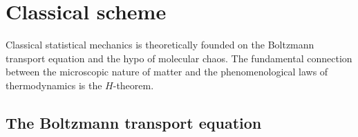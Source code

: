 

\section{Classical scheme}\label{sec:classical}

Classical statistical mechanics is theoretically founded on the Boltzmann transport
equation and the hypo of molecular chaos. The fundamental connection
between the microscopic nature of matter and the phenomenological laws of thermodynamics
is the $H$-theorem.

\subsection{The Boltzmann transport equation}

